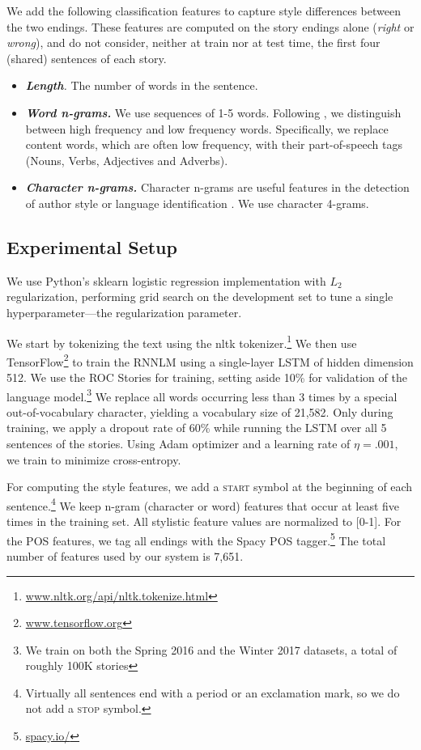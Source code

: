 \documentclass[11pt]{article}
\begin{document}
We add the following classification features to capture style differences between the two endings. 
These features are computed on the story endings alone ({\it right} or {\it wrong}), and do not consider, neither at train nor at test time, the first four (shared) sentences of each story.
\begin{itemize}
\item\textit{\textbf{Length}.} The number of words in the sentence.
\item\textit{\textbf{Word n-grams.}} We use sequences of 1-5 words. Following \cite{Tsur:2010,Schwartz:2013}, we distinguish between high frequency and low frequency words. 
Specifically, we replace content words, which are often low frequency, with their part-of-speech tags (Nouns, Verbs, Adjectives and Adverbs).
\item\textit{\textbf{Character n-grams.}} Character n-grams are useful features in the detection of author style \cite{Stamatatos:2009} or language identification \cite{lui2011cross}.
We use character 4-grams.
\end{itemize}



\subsection{Experimental Setup}
We use  Python's sklearn logistic regression implementation with $L_2$
regularization, performing grid search on the development set to
tune a single hyperparameter---the regularization parameter.  

We start by tokenizing the text using the nltk tokenizer.\footnote{\url{www.nltk.org/api/nltk.tokenize.html}} 
We then use TensorFlow\footnote{\url{www.tensorflow.org}} to train the RNNLM using a single-layer LSTM of hidden dimension 512.
We use the ROC Stories for training, setting aside 10\% for validation of the language model.\footnote{We train on both the Spring 2016 and the Winter 2017 datasets, a total of roughly 100K stories}
We replace all words occurring less than 3 times by a special out-of-vocabulary character, yielding a vocabulary size of 21,582.
Only during training, we apply a dropout rate of 60\% while running the LSTM over all 5 sentences of the stories. 
Using Adam optimizer \cite{kingma2014adam} and a learning rate of
$\eta=.001$, we train to minimize cross-entropy.

For computing the style features, we add a \textsc{start} symbol at the beginning
of each sentence.\footnote{Virtually all sentences end with a period
  or an exclamation mark, so we do not add a \textsc{stop} symbol.} 
 We keep n-gram (character or word) features that occur at least five times in the training set.
All stylistic feature values are normalized to [0-1].
For the POS features, we tag all endings with the Spacy POS tagger.\footnote{\url{spacy.io/}}
The total number of features used by our system is 7,651.
\end{document}
